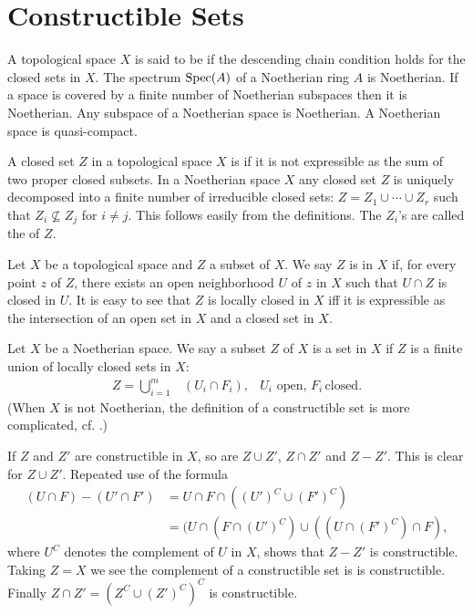 \documentclass[../main]{subfiles}
\begin{document}

\section{Constructible Sets}\label{sec:06}

\newparagraph A topological space $X$ is said to be  if the descending chain condition holds for the closed sets in $X$. The spectrum $\operatorname{Spec}(A)$ of a Noetherian ring $A$ is Noetherian. If a space is covered by a finite number of Noetherian subspaces then it is Noetherian. Any subspace of a Noetherian space is Noetherian. A Noetherian space is quasi-compact.

A closed set $Z$ in a topological space $X$ is  if it is not expressible as the sum of two proper closed subsets. In a Noetherian space $X$ any closed set $Z$ is uniquely decomposed into a finite number of irreducible closed sets: $Z = Z_1 \cup \cdots \cup Z_r$ such that $Z_i \not\subseteq Z_j$ for $i \ne j$. This follows easily from the definitions. The $Z_i$'s are called the  of $Z$. 

\newparagraph Let $X$ be a topological space and $Z$ a subset of $X$. We say $Z$ is  in $X$ if, for every point $z$ of $Z$, there exists an open neighborhood $U$ of $z$ in $X$ such that $U \cap Z$ is closed in $U$. It is easy to see that $Z$ is locally closed in $X$ iff it is expressible as the intersection of an open set in $X$ and a closed set in $X$.

Let $X$ be a Noetherian space. We say a subset $Z$ of $X$ is a  set in $X$ if $Z$ is a finite union of locally closed sets in $X$:
\[
\begin{aligned}
Z = \bigcup_{i=1} ^m &(U_i \cap F_i), &U_i \text{ open, } F_i\, \text{closed.}
\end{aligned}
\]
(When $X$ is not Noetherian, the definition of a constructible set is more complicated, cf. \cite{egaIII}.)

If $Z$ and $Z'$ are constructible in $X$, so are $Z\cup Z'$, $Z\cap Z'$ and $Z - Z'$. This is clear for $Z \cup Z'$. Repeated use of the formula
\begin{align*}
(U \cap F) - (U' \cap F') 
&= U \cap F \cap ((U')^C \cup (F')^C)\\
&= (U \cap (F \cap (U')^C) \cup ((U \cap (F')^C) \cap F),
\end{align*}
where $U^C$ denotes the complement of $U$ in $X$, shows that $Z- Z'$ is constructible. Taking $Z=X$ we see the complement of a constructible set is is constructible. Finally $Z \cap Z' = (Z^C \cup (Z')^C)^C$ is constructible.
\end{document}
